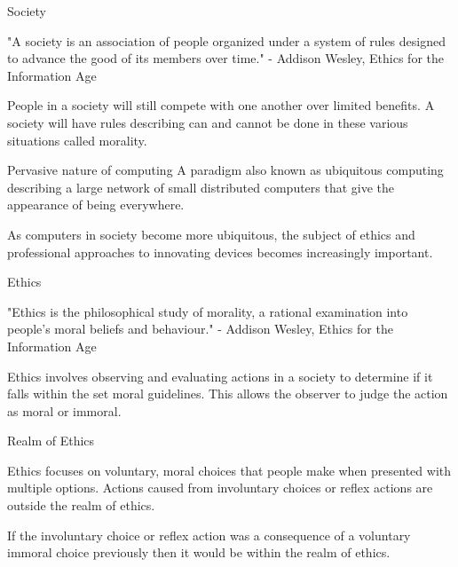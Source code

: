 \documentclass[]{../../DefinitionFormat}
\begin{document}
\begin{definition}{Society}
	\begin{summary}
	"A society is an association of people organized under a system of rules designed to advance the good of its members over time." - Addison Wesley, Ethics for the Information Age
	\end{summary}
	
	\par People in a society will still compete with one another over limited benefits. A society will have rules describing can and cannot be done in these various situations called morality.
\end{definition}

\begin{definition}{Pervasive nature of computing}
	A paradigm also known as ubiquitous computing describing a large network of small distributed computers that give the appearance of being everywhere.
	
	\par As computers in society become more ubiquitous, the subject of ethics and professional approaches to innovating devices becomes increasingly important.
\end{definition}

\begin{definition}{Ethics}
	\begin{summary}
	"Ethics is the philosophical study of morality, a rational examination into people’s
	moral beliefs and behaviour." - Addison Wesley, Ethics for the Information Age
	\end{summary}
	
	\par Ethics involves observing and evaluating actions in a society to determine if it falls within the set moral guidelines. This allows the observer to judge the action as moral or immoral.
\end{definition}

\begin{definition}{Realm of Ethics}
	\par Ethics focuses on voluntary, moral choices that people make when presented with multiple options. Actions caused from involuntary choices or reflex actions are outside the realm of ethics. 
	\par If the involuntary choice or reflex action was a consequence of a voluntary immoral choice previously then it would be within the realm of ethics.
\end{definition}
\end{document}
